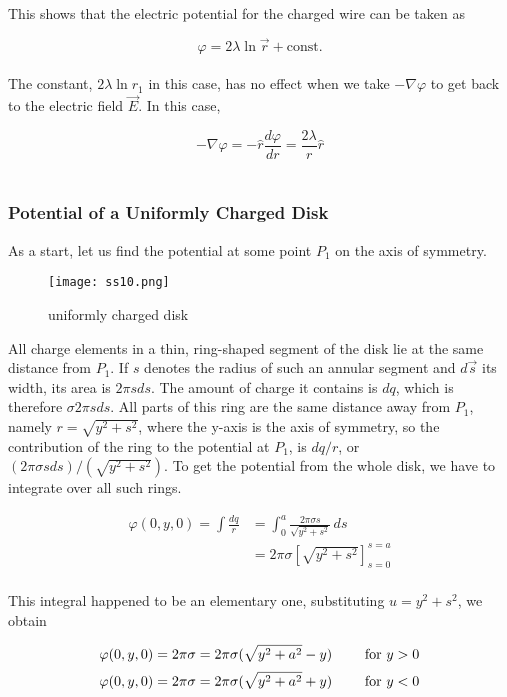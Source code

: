 \documentclass[svgnames]{article}
\begin{document}
This shows that the electric potential for the charged wire can be taken as 

\[ \varphi = 2\lambda \ln \vec{r} + \text{const.} \] \\

The constant, $2\lambda \ln r_1$ in this case, has no effect when we take
$-\nabla \varphi$ to get back to the electric field $\vec{E}$. In this case,

\[ -\nabla \varphi = -\hat{r} \frac{d \varphi}{dr} = \frac{2\lambda}{r} \hat{r} \] \\

\subsubsection{Potential of a Uniformly Charged Disk} 

As a start, let us find the potential at some point $P_1$ on the axis of symmetry. 


\begin{figure}
  \centering
  \texttt{[image: ss10.png]}
  \caption{uniformly charged disk}
\end{figure}

All charge elements in a thin, ring-shaped segment of the disk lie at the same
distance from $P_1$. If $s$ denotes the radius of such an annular segment and
$d\vec{s}$ its width, its area is $2\pi s ds$. The amount of charge it contains
is $dq$, which is therefore $\sigma 2\pi s ds$. All parts of this ring are the
same distance away from $P_1$, namely $r = \sqrt{y^2 + s^2}$, where the y-axis
is the axis of symmetry, so the contribution of the ring to the potential at
$P_1$, is $dq / r$, or $(2\pi \sigma s ds)/(\sqrt{y^2 + s^2})$. To get the
potential from the whole disk, we have to integrate over all such rings.

\begin{align*} 
\varphi(0, y, 0) = \int \frac{dq}{r} &= \int_0^a \frac{2\pi \sigma s}{\sqrt{y^2 + s^2}}\,ds \\
&= 2\pi \sigma \left[\sqrt{y^2 + s^2 }\right]_{s=0}^{s=a} 
\end{align*} \\

This integral happened to be an elementary one, substituting $u = y^2 + s^2$, we obtain 

\[ \varphi(0, y, 0) = 2\pi\sigma = 2\pi \sigma (\sqrt{y^2 + a^2} - y) \hspace{20px} \text{ for $y > 0$} \]
\[ \varphi(0, y, 0) = 2\pi\sigma = 2\pi \sigma (\sqrt{y^2 + a^2} + y) \hspace{20px} \text{ for $y < 0$} \]\\
\end{document}
